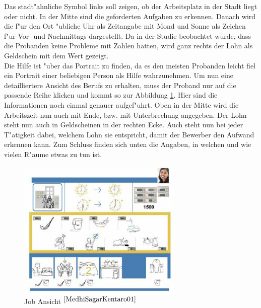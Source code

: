 Das stadt"ahnliche Symbol links soll zeigen, ob der Arbeitsplatz in der Stadt liegt oder nicht. In der Mitte sind die geforderten Aufgaben zu erkennen. Danach wird die f"ur den Ort "ubliche Uhr als Zeitangabe mit Mond und Sonne als Zeichen f"ur Vor- und Nachmittags dargestellt. Da in der Studie beobachtet wurde, dass die Probanden keine Probleme mit Zahlen hatten, wird ganz rechts der Lohn als Geldschein mit dem Wert gezeigt.\\
Die Hilfe ist "uber das Portrait zu finden, da es den meisten Probanden leicht fiel ein Portrait einer beliebigen Person als Hilfe wahrzunehmen. Um nun eine detailliertere Ansicht des Berufs zu erhalten, muss der Proband nur auf die passende Reihe klicken und kommt so zur Abbildung \ref{fig:jobclose}.
Hier sind die Informationen noch einmal genauer aufgef"uhrt. Oben in der Mitte wird die Arbeitszeit nun auch mit Ende, bzw. mit Unterbrechung angegeben. Der Lohn steht nun auch in Geldscheinen in der rechten Ecke. Auch steht nun bei jeder T"atigkeit dabei, welchem Lohn sie entspricht, damit der Bewerber den Aufwand erkennen kann. Zum Schluss finden sich unten die Angaben, in welchen und wie vielen R"aume etwas zu tun ist.

\begin{figure}[h]
	\centering
		\includegraphics[width=0.7\textwidth]{Daten/job_close.PNG}
	\caption{Job Ansicht $^{\ref{MedhiSagarKentaro01}}$}
	\label{fig:jobclose}
\end{figure}

\clearpage

